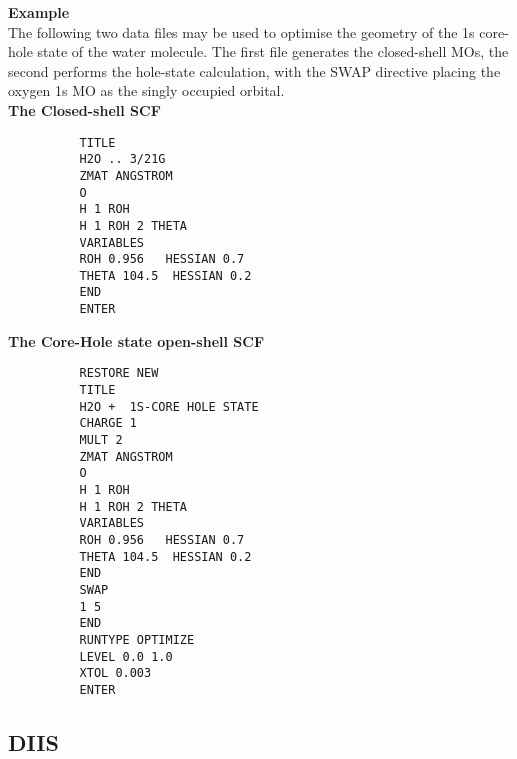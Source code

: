 \documentclass[11pt,fleqn]{article}
\begin{document}
{\bf Example}\\

The following two data files may be used to optimise the
geometry of the 1s core-hole state of the water molecule.
The first file generates the closed-shell MOs, the second
performs the hole-state calculation, with the SWAP
directive placing the oxygen 1s MO as the singly occupied
orbital.\\

{\bf The Closed-shell SCF}
{
\footnotesize
\begin{verbatim}
          TITLE
          H2O .. 3/21G
          ZMAT ANGSTROM
          O
          H 1 ROH
          H 1 ROH 2 THETA
          VARIABLES
          ROH 0.956   HESSIAN 0.7
          THETA 104.5  HESSIAN 0.2
          END
          ENTER
\end{verbatim}
}
{\bf The Core-Hole state open-shell SCF}
{
\footnotesize
\begin{verbatim}
          RESTORE NEW
          TITLE
          H2O +  1S-CORE HOLE STATE
          CHARGE 1
          MULT 2
          ZMAT ANGSTROM
          O
          H 1 ROH
          H 1 ROH 2 THETA
          VARIABLES
          ROH 0.956   HESSIAN 0.7
          THETA 104.5  HESSIAN 0.2
          END
          SWAP
          1 5
          END
          RUNTYPE OPTIMIZE
          LEVEL 0.0 1.0
          XTOL 0.003
          ENTER
\end{verbatim}
}

\subsection[DIIS]{DIIS}
\end{document}
